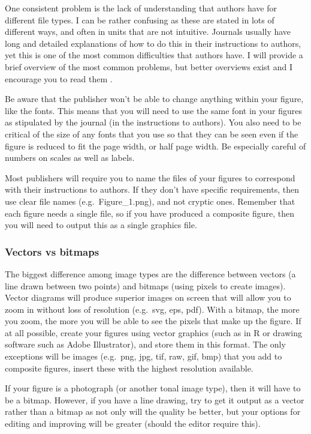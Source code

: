 \documentclass[
]{krantz}
\begin{document}
One consistent problem is the lack of understanding that authors have for different file types. I can be rather confusing as these are stated in lots of different ways, and often in units that are not intuitive. Journals usually have long and detailed explanations of how to do this in their instructions to authors, yet this is one of the most common difficulties that authors have. I will provide a brief overview of the most common problems, but better overviews exist and I encourage you to read them \citep[e.g.][]{wilke2019fundamentals}.

Be aware that the publisher won't be able to change anything within your figure, like the fonts. This means that you will need to use the same font in your figures as stipulated by the journal (in the instructions to authors). You also need to be critical of the size of any fonts that you use so that they can be seen even if the figure is reduced to fit the page width, or half page width. Be especially careful of numbers on scales as well as labels.

Most publishers will require you to name the files of your figures to correspond with their instructions to authors. If they don't have specific requirements, then use clear file names (e.g.~Figure\_1.png), and not cryptic ones. Remember that each figure needs a single file, so if you have produced a composite figure, then you will need to output this as a single graphics file.

\hypertarget{vector}{%
\subsubsection{Vectors vs bitmaps}\label{vector}}

The biggest difference among image types are the difference between vectors (a line drawn between two points) and bitmaps (using pixels to create images). Vector diagrams will produce superior images on screen that will allow you to zoom in without loss of resolution (e.g.~svg, eps, pdf). With a bitmap, the more you zoom, the more you will be able to see the pixels that make up the figure. If at all possible, create your figures using vector graphics (such as in R or drawing software such as Adobe Illustrator), and store them in this format. The only exceptions will be images (e.g.~png, jpg, tif, raw, gif, bmp) that you add to composite figures, insert these with the highest resolution available.

If your figure is a photograph (or another tonal image type), then it will have to be a bitmap. However, if you have a line drawing, try to get it output as a vector rather than a bitmap as not only will the quality be better, but your options for editing and improving will be greater (should the editor require this).
\end{document}
